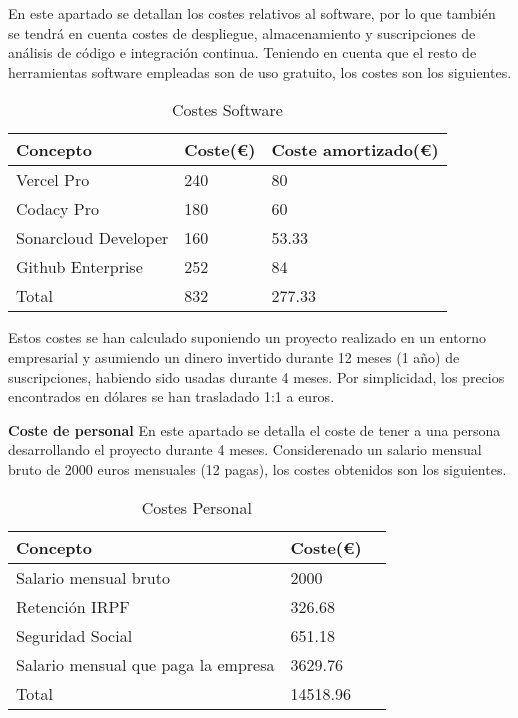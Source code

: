 En este apartado se detallan los costes relativos al software, por lo que también se tendrá en cuenta costes de despliegue, almacenamiento y suscripciones de análisis de código e integración continua. Teniendo en cuenta que el resto de herramientas software empleadas son de uso gratuito, los costes son los siguientes.
\begin{table}[H]
    \centering
    \begin{tabular}{@{}lll@{}}\toprule
         \textbf{Concepto} & \textbf{Coste(€)} & \textbf{Coste amortizado(€)} \\ \midrule
         Vercel Pro & 240 & 80\\
         Codacy Pro & 180 & 60\\
         Sonarcloud Developer & 160 & 53.33\\
         Github Enterprise & 252 & 84\\ \midrule
         Total & 832 & 277.33\\ \bottomrule
    \end{tabular}
    \caption{Costes Software}
    \label{ve:cost-soft}
\end{table}

Estos costes se han calculado suponiendo un proyecto realizado en un entorno empresarial y asumiendo un dinero invertido durante 12 meses (1 año) de suscripciones, habiendo sido usadas durante 4 meses. Por simplicidad, los precios encontrados en dólares se han trasladado 1:1 a euros.

\textbf{Coste de personal}
En este apartado se detalla el coste de tener a una persona desarrollando el proyecto durante 4 meses. Considerenado un salario mensual bruto de 2000 euros mensuales (12 pagas), los costes obtenidos son los siguientes.
\begin{table}[H]
    \centering
    \begin{tabular}{@{}lll@{}}\toprule
         \textbf{Concepto }& \textbf{Coste(€)} \\ \midrule
         Salario mensual bruto & 2000\\
         Retención IRPF & 326.68\\
         Seguridad Social & 651.18\\
         Salario mensual que paga la empresa & 3629.76\\ \midrule
         Total & 14518.96\\ \bottomrule
    \end{tabular}
    \caption{Costes Personal}
    \label{ve:cost-per}
\end{table}

